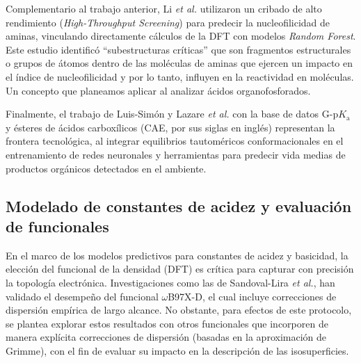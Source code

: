 \documentclass[12pt]{article}
\begin{document}
	Complementario al trabajo anterior, Li \textit{et al.} \cite{Li2024} utilizaron un cribado de alto rendimiento (\textit{High-Throughput Screening}) para predecir la nucleofilicidad de aminas, vinculando directamente c\'{a}lculos de la DFT con modelos \textit{Random Forest}. Este estudio identific\'{o} ``subestructuras cr\'{i}ticas'' que son fragmentos estructurales o grupos de átomos dentro de las moléculas de aminas que ejercen un impacto en el índice de nucleofilicidad y por lo tanto,  influyen en la reactividad en mol\'{e}culas. Un concepto que planeamos aplicar al analizar \'{a}cidos organofosforados. 
	
	\clearpage
	
	Finalmente, el trabajo de Luis-Sim\'{o}n \cite{Simon2026} y Lazare \textit{et al.} \cite{Lazare2025} con la base de datos G-$\mathrm{p}K_{\mathrm{a}}$ y \'{e}steres de \'{a}cidos carbox\'{i}licos (CAE, por sus siglas en ingl\'{e}s) representan la frontera tecnol\'{o}gica, al integrar equilibrios tautom\'{e}ricos conformacionales en el entrenamiento de redes neuronales y herramientas para predecir vida medias de productos org\'{a}nicos detectados en el ambiente. 
	
	
	
	\subsection{Modelado de constantes de acidez y evaluaci\'{o}n de funcionales}
	
	En el marco de los modelos predictivos para constantes de acidez y basicidad, la elecci\'{o}n del funcional de la densidad (DFT) es cr\'{i}tica para capturar con precisi\'{o}n la topolog\'{i}a electr\'{o}nica. Investigaciones como las de Sandoval-Lira \textit{et al.}\cite{bib:sandovallira2020}, han validado el desempeño del funcional  $\omega$B97X-D, el cual incluye correcciones de dispersi\'{o}n emp\'{i}rica de largo alcance. No obstante, para efectos de este protocolo, se plantea explorar estos resultados con otros funcionales que incorporen de manera expl\'{i}cita correcciones de dispersi\'{o}n (basadas en la aproximaci\'{o}n de Grimme), con el fin de evaluar su impacto en la descripci\'{o}n de las isosuperficies.
	
\end{document}
